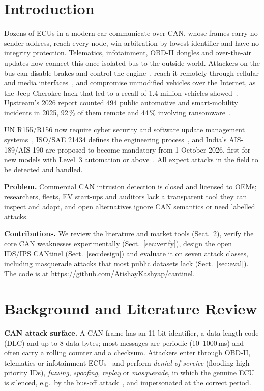 \documentclass[runningheads]{llncs}
\begin{document}
\section{Introduction}
Dozens of ECUs in a modern car communicate over CAN, whose frames carry no sender address, reach
every node, win arbitration by lowest identifier and have no integrity protection. Telematics, infotainment, OBD-II
dongles and over-the-air updates now connect this once-isolated bus to the outside world. Attackers on the bus can disable brakes and control
the engine~\cite{koscher2010}, reach it remotely through cellular and media interfaces~\cite{checkoway2011}, and
compromise unmodified vehicles over the Internet, as the Jeep Cherokee hack that led to a recall of 1.4 million
vehicles showed~\cite{miller2015}. Upstream's 2026 report counted 494 public automotive and smart-mobility incidents in
2025, 92\,\% of them remote and 44\,\% involving ransomware~\cite{upstream2026}.

UN R155/R156 now require cyber security and software update management systems~\cite{unr155}, ISO/SAE 21434
defines the engineering process~\cite{iso21434}, and India's AIS-189/AIS-190 are proposed to become mandatory from
1 October 2026, first for new models with Level~3 automation or above~\cite{ais189}. All expect attacks in the field to
be detected and handled.

\textbf{Problem.} Commercial CAN intrusion detection is closed and licensed to OEMs; researchers, fleets, EV
start-ups and auditors lack a transparent tool they can inspect and adapt, and open alternatives ignore CAN semantics or
need labelled attacks.

\textbf{Contributions.} We review the literature and market tools (Sect.~\ref{sec:lit}), verify the core CAN
weaknesses experimentally (Sect.~\ref{sec:verify}), design the open IDS/IPS CANtinel (Sect.~\ref{sec:design}) and
evaluate it on seven attack classes, including masquerade attacks that most public datasets lack (Sect.~\ref{sec:eval}). The code is at \url{https://github.com/AtishayKashyap/cantinel}.

\section{Background and Literature Review}\label{sec:lit}
\textbf{CAN attack surface.} A CAN frame has an 11-bit identifier, a data length code (DLC) and up to 8 data bytes;
most messages are periodic (10--1000\,ms) and often carry a rolling counter and a checksum. Attackers enter through
OBD-II, telematics or infotainment ECUs~\cite{checkoway2011} and perform \emph{denial of service} (flooding high-priority IDs), \emph{fuzzing},
\emph{spoofing}, \emph{replay} or \emph{masquerade}, in which the genuine ECU is silenced, e.g.\ by the bus-off
attack~\cite{cho2016busoff}, and impersonated at the correct period.
\end{document}
